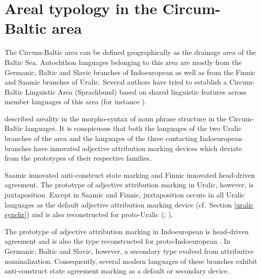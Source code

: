 
\chapter{Areal typology in the Circum-Baltic area}\label{circumbaltic}
The Circum-Baltic area can be defined geographically as the drainage area of the Baltic Sea. Autochthon languages belonging to this area are mostly from the Germanic, Baltic and Slavic branches of Indoeuropean as well as from the Finnic and Saamic branches of Uralic. Several authors have tried to establish a Circum-Baltic Linguistic Area (Sprachbund) based on shared linguistic features across member languages of this area (for instance \citealt{koptjevskaja-tamm2006}).

\cite{riesler2006a} described areality in the morpho-syntax of noun phrase structure in the Circum-Baltic languages. It is conspicuous that both the languages of the two Uralic branches of the area and the languages of the three contacting Indoeuropean branches have innovated adjective attribution marking devices which deviate from the prototypes of their respective families.

Saamic innovated anti-construct state marking and Finnic innovated head-driven agreement. The prototype of adjective attribution marking in Uralic, however, is juxtaposition. Except in Saamic and Finnic, juxtaposition occurs in all Uralic languages as the default adjective attribution marking device (cf.~Section \ref{uralic synchr}) and is also reconstructed for proto-Uralic (\citealt[66, 81]{decsy1990}; \citealt[32]{janhunen1981}).

The prototype of adjective attribution marking in Indoeuropean is head-driven agreement and is also the type reconstructed for proto-Indoeuropean \citep{decsy1991,watkins1998}. In Germanic, Baltic and Slavic, however, a secondary type evolved from attributive nominalization. Consequently, several modern languages of these branches exhibit anti-construct state agreement marking as a default or secondary device.

